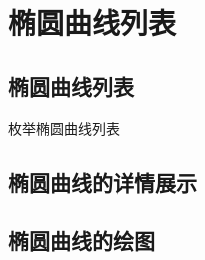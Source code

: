 \documentclass[../Main.tex]{subfiles}
\begin{document}
\chapter{椭圆曲线列表}


\section{椭圆曲线列表}
枚举椭圆曲线列表
\begin{enumerate}

\end{enumerate}

\section{椭圆曲线的详情展示}

\begin{enumerate}

\end{enumerate}

\section{椭圆曲线的绘图}

\end{document}
